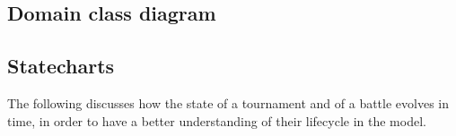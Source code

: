 \subsection{Domain class diagram}
\begin{adjustbox}{
		max size={\textwidth}{},
		caption={Domain class diagram},
		label={fig:Domain class diagram},
		figure=H}
	\centering
\end{adjustbox}
\pagebreak

\subsection{Statecharts}

The following discusses how the state of a tournament and of a battle
evolves in time, in order to have a better understanding of their lifecycle
in the model.

